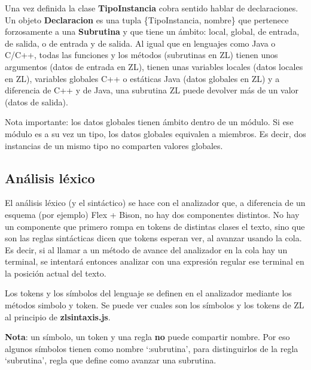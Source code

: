 \documentclass{report}
\begin{document}
	\vspace{10px}
	
	Una vez definida la clase \textbf{TipoInstancia} cobra sentido hablar de declaraciones. Un objeto \textbf{Declaracion} es una tupla \{TipoInstancia, nombre\} que pertenece forzosamente a una \textbf{Subrutina} y que tiene un ámbito: local, global, de entrada, de salida, o de entrada y de salida. Al igual que en lenguajes como Java o C/C++, todas las funciones y los métodos (subrutinas en ZL) tienen unos argumentos (datos de entrada en ZL), tienen unas variables locales (datos locales en ZL), variables globales C++ o estáticas Java (datos globales en ZL) y a diferencia de C++ y de Java, una subrutina ZL puede devolver más de un valor (datos de salida).
	
	\vspace{10px}
	\noindent
	Nota importante: los datos globales tienen ámbito dentro de un módulo. Si ese módulo es a su vez un tipo, los datos globales equivalen a miembros. Es decir, dos instancias de un mismo tipo no comparten valores globales. 
	
	
	\subsection{Análisis léxico}
	
	El análisis léxico (y el sintáctico) se hace con el analizador que, a diferencia de un esquema (por ejemplo) Flex + Bison, no hay dos componentes distintos. No hay un componente que primero rompa en tokens de distintas clases el texto, sino que son las reglas sintácticas dicen que tokens esperan ver, al avanzar usando la cola. Es decir, si al llamar a un método de avance del analizador en la cola hay un terminal, se intentará entonces analizar con una expresión regular ese terminal en la posición actual del texto. 
	
	Los tokens y los símbolos del lenguaje se definen en el analizador mediante los métodos simbolo y token. Se puede ver cuales son los símbolos y los tokens de ZL al principio de \textbf{zlsintaxis.js}. 
	
	\vspace{10px}
	\noindent
	\textbf{Nota}: un símbolo, un token y una regla \textbf{no} puede compartir nombre. Por eso algunos símbolos tienen como nombre `:subrutina', para distinguirlos de la regla `subrutina', regla que define como avanzar una subrutina.
	
	\vspace{10px}
	
\end{document}
